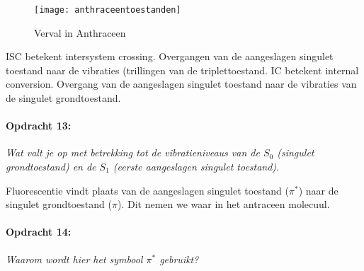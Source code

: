 \begin{figure}[h]
\noindent \begin{centering}
\texttt{[image: anthraceentoestanden]}
\par\end{centering}

\caption{\label{fig:Verval-in-Anthraceen}Verval in Anthraceen}
\end{figure}


ISC betekent intersystem crossing. Overgangen van de aangeslagen singulet
toestand naar de vibraties (trillingen van de triplettoestand. IC
betekent internal conversion. Overgang van de aangeslagen singulet
toestand naar de vibraties van de singulet grondtoestand.


\paragraph*{Opdracht 13:}

\emph{Wat valt je op met betrekking tot de vibratieniveaus van de
$S_{0}$ (singulet grondtoestand) en de $S_{1}$ (eerste aangeslagen
singulet toestand).}

Fluorescentie vindt plaats van de aangeslagen singulet toestand ($\pi^{*}$)
naar de singulet grondtoestand ($\pi$). Dit nemen we waar in het
antraceen molecuul.


\paragraph*{Opdracht 14:}

\emph{Waarom wordt hier het symbool $\pi^{*}$ gebruikt?}


